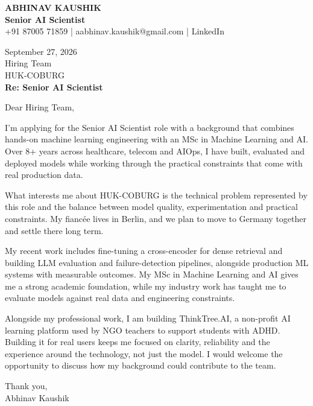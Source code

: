 \documentclass[10pt,a4paper]{article}
\begin{document}
\begin{center}
{\Large\bfseries ABHINAV KAUSHIK}\\[2pt]
{\bfseries Senior AI Scientist}\\[2pt]
+91 87005 71859 \quad | \quad aabhinav.kaushik@gmail.com \quad | \quad LinkedIn
\end{center}
\vspace{8pt}
September 27, 2026\\[6pt]
Hiring Team\\
HUK-COBURG\\[4pt]
\textbf{Re: Senior AI Scientist}

Dear Hiring Team,

I’m applying for the Senior AI Scientist role with a background that combines hands-on machine learning engineering with an MSc in Machine Learning and AI. Over 8+ years across healthcare, telecom and AIOps, I have built, evaluated and deployed models while working through the practical constraints that come with real production data.

What interests me about HUK-COBURG is the technical problem represented by this role and the balance between model quality, experimentation and practical constraints. My fiancée lives in Berlin, and we plan to move to Germany together and settle there long term.

My recent work includes fine-tuning a cross-encoder for dense retrieval and building LLM evaluation and failure-detection pipelines, alongside production ML systems with measurable outcomes. My MSc in Machine Learning and AI gives me a strong academic foundation, while my industry work has taught me to evaluate models against real data and engineering constraints.

Alongside my professional work, I am building ThinkTree.AI, a non-profit AI learning platform used by NGO teachers to support students with ADHD. Building it for real users keeps me focused on clarity, reliability and the experience around the technology, not just the model. I would welcome the opportunity to discuss how my background could contribute to the team.

Thank you,\\
Abhinav Kaushik
\end{document}
